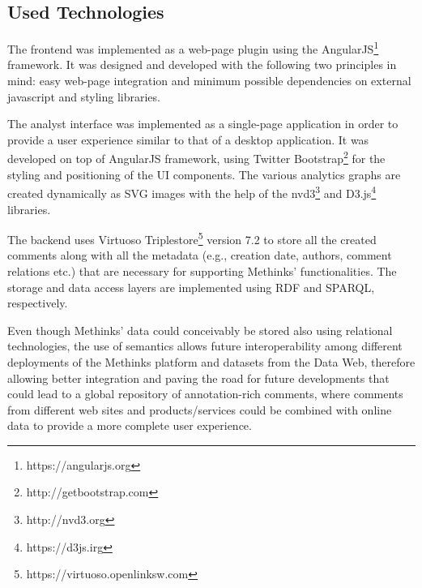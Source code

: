 \documentclass[runningheads,a4paper]{llncs}
\begin{document}
\subsection{Used Technologies}

The frontend was implemented as a web-page plugin using the AngularJS\footnote{ https://angularjs.org} framework. It was designed and developed with the following two principles in mind: easy web-page integration and minimum possible dependencies on external javascript and styling libraries.

The analyst interface was implemented as a single-page application in order to provide a user experience similar to that of a desktop application. It was developed on top of AngularJS framework, using Twitter Bootstrap\footnote{ http://getbootstrap.com} for the styling and positioning of the UI  components. The various analytics graphs are created dynamically as SVG images with the help of the nvd3\footnote{ http://nvd3.org} and D3.js\footnote{ https://d3js.irg} libraries.

The backend uses Virtuoso Triplestore\footnote{ https://virtuoso.openlinksw.com} version 7.2 to store all the created comments along with all the metadata (e.g., creation date, authors, comment relations etc.) that are necessary for supporting Methinks' functionalities. The storage and data access layers are implemented using RDF and SPARQL, respectively.

Even though Methinks' data could conceivably be stored also using relational technologies, the use of semantics allows future interoperability among different deployments of the Methinks platform and datasets from the Data Web, therefore allowing better integration and paving the road for future developments that could lead to a global repository of annotation-rich comments, where comments from different web sites and products/services could be combined with online data to provide a more complete user experience.
\end{document}

